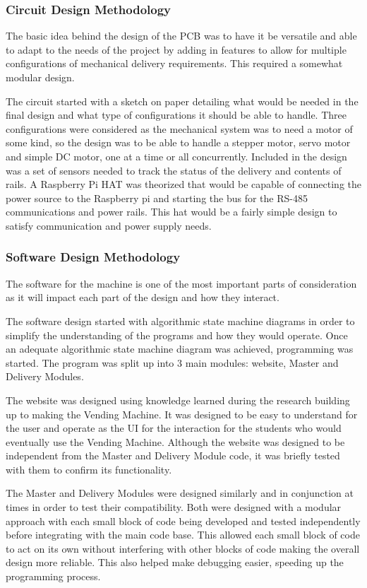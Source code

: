 \documentclass[a4paper,11pt]{article}
\numberwithin{figure}{section}
\numberwithin{table}{section}
\begin{document}
\subsubsection{Circuit Design Methodology}
The basic idea behind the design of the PCB was to have it be versatile and able to adapt to the needs of the project by adding in features to allow for multiple configurations of mechanical delivery requirements. This required a somewhat modular design.

The circuit started with a sketch on paper detailing what would be needed in the final design and what type of configurations it should be able to handle. Three configurations were considered as the mechanical system was to need a motor of some kind, so the design was to be able to handle a stepper motor, servo motor and simple DC motor, one at a time or all concurrently. Included in the design was a set of sensors needed to track the status of the delivery and contents of rails.
A Raspberry Pi HAT was theorized that would be capable of connecting the power source to the Raspberry pi and starting the bus for the RS-485 communications and power rails. This hat would be a fairly simple design to satisfy communication and power supply needs.



\subsubsection{Software Design Methodology}
The software for the machine is one of the most important parts of consideration as it will impact each part of the design and how they interact.

The software design started with algorithmic state machine diagrams in order to simplify the understanding of the programs and how they would operate. Once an adequate algorithmic state machine diagram was achieved, programming was started. The program was split up into 3 main modules: website, Master and Delivery Modules. 

The website was designed using knowledge learned during the research building up to making the Vending Machine. It was designed to be easy to understand for the user and operate as the UI for the interaction for the students who would eventually use the Vending Machine. Although the website was designed to be independent from the Master and Delivery Module code, it was briefly tested with them to confirm its functionality.

The Master and Delivery Modules were designed similarly and in conjunction at times in order to test their compatibility. Both were designed with a modular approach with each small block of code being developed and tested independently before integrating with the main code base. This allowed each small block of code to act on its own without interfering with other blocks of code making the overall design more reliable. This also helped make debugging easier, speeding up the programming process.
\end{document}
